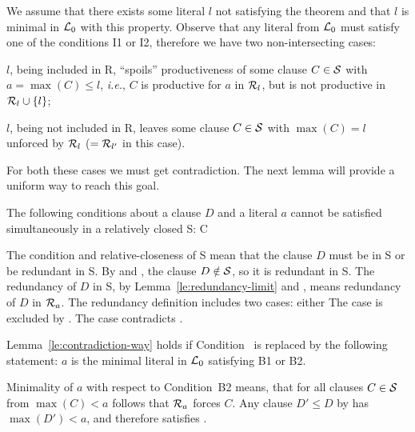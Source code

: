 \begin{PROOF} We assume that there exists some literal $l$ not satisfying
the theorem and that $l$ is minimal in \(\mbox {$\cal L$}_0\) with this property.
Observe that any literal from \(\mbox {$\cal L$}_0\) must satisfy one of the conditions 
I1 or I2, therefore we have two non-intersecting cases:
\begin{description}\MyLPar
\item[B1.] $l$, being included in \C R, ``spoils'' productiveness of some 
  clause \(C\in\mbox {$\cal S$}\) with \(a=\max (C) \leq l\), {\em i.e.}, $C$ is productive
  for $a$ in \(\mbox {$\cal R$}_l\), but is not productive in \(\mbox {$\cal R$}_l\cup\{l\}\);
\item[B2.] $l$, being not included in \C R, leaves 
 some clause \(C\in\mbox {$\cal S$}\) with \(\max (C)=l\) unforced by \(\mbox {$\cal R$}_l\) 
(\(=\mbox {$\cal R$}_{l'}\) in this case).
\end{description}

For both these cases we must get contradiction. The next lemma
will provide a uniform way to reach this goal.
\begin{LEMMA}\label {le:contradiction-way}
The following conditions about a clause $D$ and a literal $a$ cannot be 
satisfied simultaneously in a relatively closed \C S:
\newITEM C
\end{LEMMA}
\begin{PROOF}
The condition  and relative-closeness of \C S mean that the clause $D$
must be in \C S or be redundant in \C S. 
By   and , the
clause \(D\notin\mbox {$\cal S$}\), so it is redundant in \C S. The
redundancy of $D$ in \C S, by Lemma~\ref {le:redundancy-limit} and , means
redundancy of $D$ in \(\mbox {$\cal R$}_a\). The redundancy definition includes two cases:
either
 The case  is excluded by . The case  
contradicts .
\end{PROOF}

\begin{COROLLARY} \label{cor:contradiction-way}
Lemma~\ref {le:contradiction-way} holds if Condition~ is replaced by the
following  statement:  $a$ is the minimal literal in \(\mbox {$\cal L$}_0\) satisfying
B1 or B2.
\end{COROLLARY}
\begin{PROOF}
Minimality of $a$ with respect to Condition~B2
means, that  for all clauses
$C\in\mbox {$\cal S$}$ from \(\max(C)<a\) follows that \(\mbox {$\cal R$}_a\) forces $C$. Any clause
\(D'\leq D\) by  has \(\max(D')<a\), and therefore satisfies .
\end{PROOF}
\vspace{1ex}


\end{PROOF}
